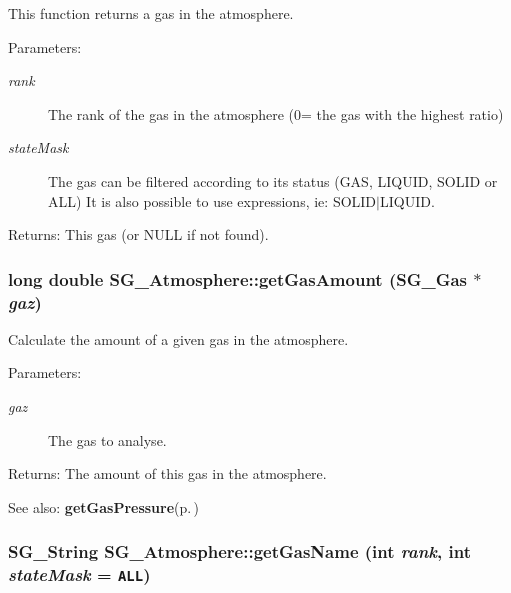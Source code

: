 This function returns a gas in the atmosphere. 

\begin{Desc}
\item[Parameters:]
\begin{description}
\item[{\em rank}]The rank of the gas in the atmosphere (0= the gas with the highest ratio) \item[{\em state\-Mask}]The gas can be filtered according to its status (GAS, LIQUID, SOLID or ALL) It is also possible to use expressions, ie: SOLID$|$LIQUID. \end{description}
\end{Desc}
\begin{Desc}
\item[Returns:]This gas (or NULL if not found). \end{Desc}
\subsubsection{\setlength{\rightskip}{0pt plus 5cm}long double SG\_\-Atmosphere::get\-Gas\-Amount ({\bf SG\_\-Gas} $\ast$ {\em gaz})\hspace{0.3cm}{\tt  [protected]}}\label{class_s_g___atmosphere_b4}


Calculate the amount of a given gas in the atmosphere. 

\begin{Desc}
\item[Parameters:]
\begin{description}
\item[{\em gaz}]The gas to analyse. \end{description}
\end{Desc}
\begin{Desc}
\item[Returns:]The amount of this gas in the atmosphere. \end{Desc}
\begin{Desc}
\item[See also:]{\bf get\-Gas\-Pressure}{\rm (p.\,\pageref{class_s_g___atmosphere_b5})} \end{Desc}
\subsubsection{\setlength{\rightskip}{0pt plus 5cm}SG\_\-String SG\_\-Atmosphere::get\-Gas\-Name (int {\em rank}, int {\em state\-Mask} = {\tt ALL})}\label{class_s_g___atmosphere_a5}


